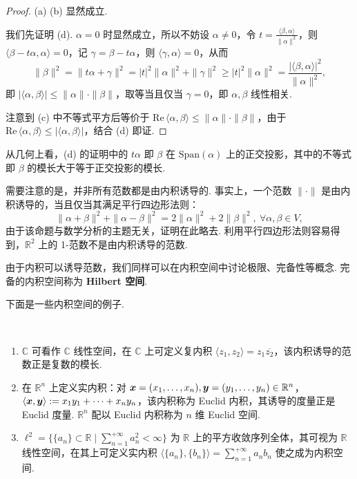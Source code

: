\documentclass[../main.tex]{subfiles}
\begin{document}
\begin{proof}
    (a) (b) 显然成立. 

    我们先证明 (d). $\alpha = 0$ 时显然成立，所以不妨设 $\alpha \neq 0$，令 $t = \frac{\langle \beta, \alpha \rangle}{\|\alpha\|^2}$，则 $\langle \beta - t\alpha, \alpha \rangle = 0$，记 $\gamma = \beta - t\alpha$，则 $\langle \gamma, \alpha \rangle = 0$，从而 
    $$
    \|\beta\|^2 = \|t\alpha + \gamma\|^2 = |t|^2\|\alpha\|^2 + \|\gamma\|^2 \geqslant |t|^2\|\alpha\|^2 = \frac{|\langle \beta, \alpha \rangle|^2}{\|\alpha\|^2}, 
    $$
    即 $|\langle \alpha, \beta \rangle| \leqslant \|\alpha\| \cdot \|\beta\|$，取等当且仅当 $\gamma = 0$，即 $\alpha, \beta$ 线性相关. 

    注意到 (c) 中不等式平方后等价于 $\mathrm{Re}\, \langle \alpha, \beta \rangle \leqslant \|\alpha\| \cdot \|\beta\|$，由于 $\mathrm{Re}\, \langle \alpha, \beta \rangle \leqslant |\langle \alpha, \beta \rangle|$，结合 (d) 即证. 
\end{proof}

\begin{remark}
    从几何上看，(d) 的证明中的 $t\alpha$ 即 $\beta$ 在 $\mathrm{Span}(\alpha)$ 上的正交投影，其中的不等式即 $\beta$ 的模长大于等于正交投影的模长. 
\end{remark}

需要注意的是，并非所有范数都是由内积诱导的. 事实上，一个范数 $\|\cdot\|$ 是由内积诱导的，当且仅当其满足平行四边形法则：
$$
\|\alpha + \beta\|^2 + \|\alpha - \beta\|^2 = 2\|\alpha\|^2 + 2\|\beta\|^2,\ \forall \alpha, \beta \in V, 
$$
由于该命题与数学分析的主题无关，证明在此略去. 利用平行四边形法则容易得到，$\mathbb R^2$ 上的 1-范数不是由内积诱导的范数. 

由于内积可以诱导范数，我们同样可以在内积空间中讨论极限、完备性等概念. 完备的内积空间称为 \textbf{Hilbert 空间}. 

下面是一些内积空间的例子. 

\begin{example}[内积空间的例子]
    \ 
    \begin{enumerate}[label = (\alph*)]
        \item $\mathbb C$ 可看作 $\mathbb C$ 线性空间，在 $\mathbb C$ 上可定义复内积 $\langle z_1, z_2 \rangle = z_1 \overline{z_2}$，该内积诱导的范数正是复数的模长. 
        \item 在 $\mathbb R^n$ 上定义实内积：对 $\boldsymbol x = (x_1, \dots, x_n), \boldsymbol y = (y_1, \dots, y_n) \in \mathbb R^n$，$\langle \boldsymbol x, \boldsymbol y \rangle := x_1 y_1 + \cdots + x_n y_n$，该内积称为 Euclid 内积，其诱导的度量正是 Euclid 度量. $\mathbb R^n$ 配以 Euclid 内积称为 $n$ 维 Euclid 空间. 
        \item $\ell^2 = \{\{a_n\} \subset \mathbb R \mid \sum\limits_{n = 1}^{+\infty} a_n^2 < \infty\}$ 为 $\mathbb R$ 上的平方收敛序列全体，其可视为 $\mathbb R$ 线性空间，在其上可定义实内积 $\langle \{a_n\}, \{b_n\} \rangle = \sum\limits_{n = 1}^{+\infty} a_n b_n$ 使之成为内积空间. 
    \end{enumerate}
\end{example}
\end{document}
